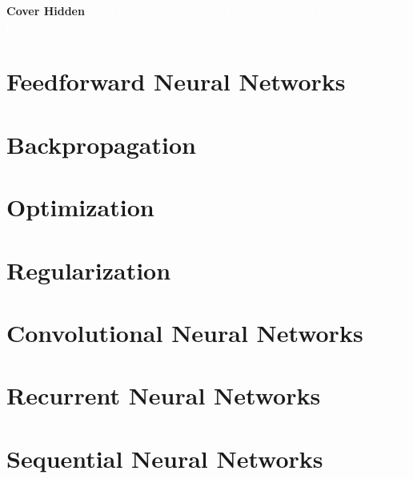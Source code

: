 \documentclass[11pt,fleqn,oneside]{book} %
\newcommand{\AUTHOR}{Federico Brancasi}
\newcommand{\DATE}{\today}
\newcommand{\TITLE}{Deep Learning}
\newcommand{\SUBTITLE}{University of Trento}
\newcommand{\SUBJECT}{Demo}
\renewcommand{\coverpage}[5]{{\Huge\textbf{Cover Hidden}}
    \textcolor{white}{#1, #2, #3, #4, #5}}
\begin{document}

\coverpage{\TITLE}{\SUBTITLE}{\AUTHOR}{\DATE}{\SUBJECT}

\newpage
\tableofcontents


%


\newpage
\chapter{Feedforward Neural Networks} 


\newpage
\chapter{Backpropagation} 


\newpage
\chapter{Optimization}


\newpage
\chapter{Regularization}


\newpage
\chapter{Convolutional Neural Networks}


\newpage
\chapter{Recurrent Neural Networks}


\newpage
\chapter{Sequential Neural Networks}

\end{document}
